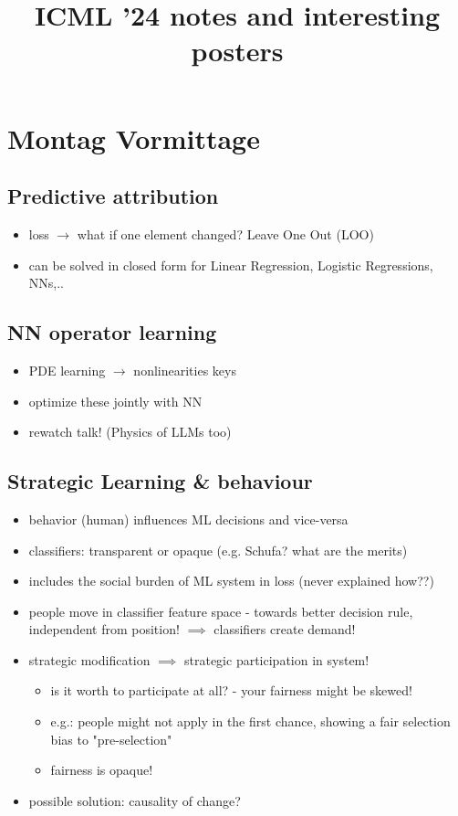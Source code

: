 \documentclass[a4paper]{article}
\title{ICML '24 notes and interesting posters}
\begin{document}
\maketitle

\section*{Montag Vormittage}
\subsection*{Predictive attribution}
\begin{itemize}
    \item loss $\rightarrow$ what if one element changed? Leave One Out (LOO)
    \item can be solved in closed form for Linear Regression, Logistic Regressions, NNs,..
\end{itemize}
\subsection*{NN operator learning}
\begin{itemize}
    \item PDE learning $\rightarrow$ nonlinearities keys
    \item optimize these jointly with NN
    \item rewatch talk! (Physics of LLMs too)
\end{itemize}
\subsection*{Strategic Learning \& behaviour}
\begin{itemize}
    \item behavior (human) influences ML decisions and vice-versa
    \item classifiers: transparent or opaque (e.g. Schufa? what are the merits)
    \item includes the social burden of ML system in loss (never explained how??)
    \item people move in classifier feature space - towards better decision rule, independent from position! $\implies$ classifiers create demand!
    \item strategic modification $\implies$ strategic participation in system!
          \begin{itemize}
              \item is it worth to participate at all? - your fairness might be skewed!
              \item e.g.: people might not apply in the first chance, showing a fair selection bias to "pre-selection"
              \item fairness is opaque!
          \end{itemize}
    \item possible solution: causality of change?
\end{itemize}
\end{document}
